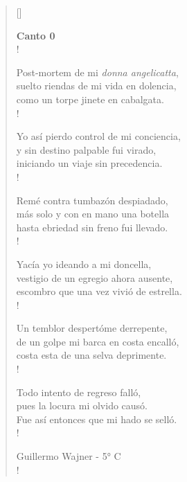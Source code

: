 \documentclass[11pt, a4paper]{article}
\begin{document}
{\sffamily

\vspace{\stanzaskip}

\settowidth{\versewidth}{costa esta de una selva deprimente.}

\begin{verse}[\versewidth]

\textbf{\large{Canto 0}}\\!

Post-mortem de mi \textit{donna angelicatta},\\
suelto riendas de mi vida en dolencia,\\
como un torpe jinete en cabalgata.\\!

Yo así pierdo control de mi conciencia,\\
y sin destino palpable fui virado,\\
iniciando un viaje sin precedencia.\\!

Remé contra tumbazón despiadado,\\
más solo y con en mano una botella\\
hasta ebriedad sin freno fui llevado.\\!

Yacía yo ideando a mi doncella,\\
vestigio de un egregio ahora ausente,\\
escombro que una vez vivió de estrella.\\!

Un temblor despertóme derrepente,\\
de un golpe mi barca en costa encalló,\\
costa esta de una selva deprimente.\\!

Todo intento de regreso falló,\\
pues la locura mi olvido causó.\\
Fue así entonces que mi hado se selló.\\!

\vspace{\stanzaskip}

Guillermo Wajner - 5° C\\!

\end{verse}

}
\end{document}
